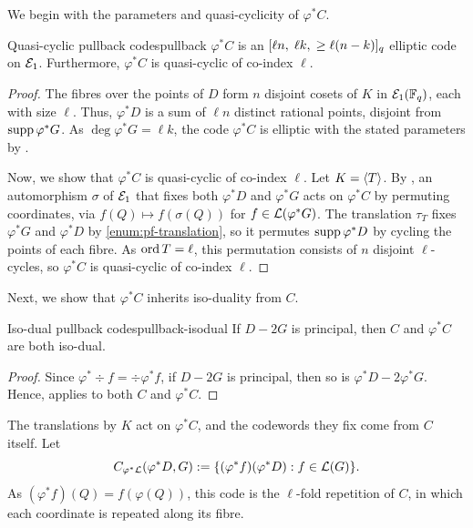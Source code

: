 \documentclass[twocolumn, 11pt]{scrartcl}
\begin{document}
We begin with the parameters and quasi-cyclicity of $\varphi^*C$.

\begin{theorem}{Quasi-cyclic pullback codes}{pullback}
$\varphi^*C$ is an $[\ell n,\;\ell k,\;\geq\ell(n-k)]_q$ elliptic code on $\mathcal{E}_1$. Furthermore, $\varphi^*C$ is quasi-cyclic of co-index $\ell$.
\end{theorem}

\begin{proof}
The fibres over the points of $D$ form $n$ disjoint cosets of $K$ in $\mathcal{E}_1(\mathbb{F}_q)$, each with size $\ell$. Thus, $\varphi^*D$ is a sum of $\ell n$ distinct rational points, disjoint from $\operatorname{supp}\varphi^*G$. As $\deg\varphi^*G=\ell k$, the code $\varphi^*C$ is elliptic with the stated parameters by .

Now, we show that $\varphi^*C$ is quasi-cyclic of co-index $\ell$. Let $K=\langle T\rangle$. By \cite[Prop.~8.2.3(a)]{stichtenoth2009algebraic}, an automorphism $\sigma$ of $\mathcal{E}_1$ that fixes both $\varphi^*D$ and $\varphi^*G$ acts on $\varphi^*C$ by permuting coordinates, via $f(Q)\mapsto f(\sigma(Q))$ for $f\in\mathcal{L}(\varphi^*G)$. The translation $\tau_T$ fixes $\varphi^*G$ and $\varphi^*D$ by \ref{enum:pf-translation}, so it permutes $\operatorname{supp}\varphi^*D$ by cycling the points of each fibre. As $\operatorname{ord} T=\ell$, this permutation consists of $n$ disjoint $\ell$-cycles, so $\varphi^*C$ is quasi-cyclic of co-index $\ell$.
\end{proof}

Next, we show that $\varphi^*C$ inherits iso-duality from $C$.

\begin{corollary}{Iso-dual pullback codes}{pullback-isodual}
    If $D-2G$ is principal, then $C$ and $\varphi^*C$ are both iso-dual.
\end{corollary}

\begin{proof}
    Since $\varphi^*\div f=\div\varphi^*f$, if $D-2G$ is principal, then so is $\varphi^*D-2\varphi^*G$. Hence,  applies to both $C$ and $\varphi^*C$.
\end{proof}

The translations by $K$ act on $\varphi^*C$, and the codewords they fix come from $C$ itself. Let
\[ C_{\varphi^*\mathcal{L}}(\varphi^*D,G):=\{(\varphi^*f)(\varphi^*D):f\in\mathcal{L}(G)\}. \]
As $(\varphi^*f)(Q)=f(\varphi(Q))$, this code is the $\ell$-fold repetition of $C$, in which each coordinate is repeated along its fibre.
\end{document}

